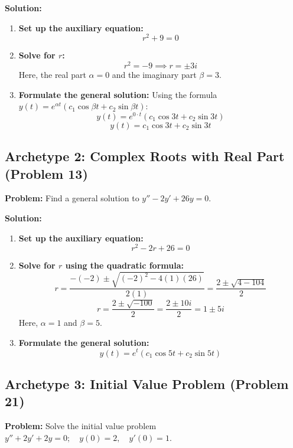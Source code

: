 \documentclass[11pt]{article}
\begin{document}
\textbf{Solution:}
\begin{enumerate}
    \item \textbf{Set up the auxiliary equation:} 
    \[ r^2 + 9 = 0 \]
    \item \textbf{Solve for $r$:}
    \[ r^2 = -9 \implies r = \pm 3i \]
    Here, the real part $\alpha = 0$ and the imaginary part $\beta = 3$.
    \item \textbf{Formulate the general solution:}
    Using the formula $y(t) = e^{\alpha t}(c_1 \cos \beta t + c_2 \sin \beta t)$:
    \[ y(t) = e^{0 \cdot t}(c_1 \cos 3t + c_2 \sin 3t) \]
    \[ y(t) = c_1 \cos 3t + c_2 \sin 3t \]
\end{enumerate}

\subsection{Archetype 2: Complex Roots with Real Part (Problem 13)}
\textbf{Problem:} Find a general solution to $y'' - 2y' + 26y = 0$.

\textbf{Solution:}
\begin{enumerate}
    \item \textbf{Set up the auxiliary equation:} 
    \[ r^2 - 2r + 26 = 0 \]
    \item \textbf{Solve for $r$ using the quadratic formula:}
    \[ r = \frac{-(-2) \pm \sqrt{(-2)^2 - 4(1)(26)}}{2(1)} = \frac{2 \pm \sqrt{4 - 104}}{2} \]
    \[ r = \frac{2 \pm \sqrt{-100}}{2} = \frac{2 \pm 10i}{2} = 1 \pm 5i \]
    Here, $\alpha = 1$ and $\beta = 5$.
    \item \textbf{Formulate the general solution:}
    \[ y(t) = e^{t}(c_1 \cos 5t + c_2 \sin 5t) \]
\end{enumerate}

\subsection{Archetype 3: Initial Value Problem (Problem 21)}
\textbf{Problem:} Solve the initial value problem $y'' + 2y' + 2y = 0; \quad y(0) = 2, \quad y'(0) = 1$.
\end{document}
